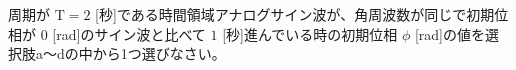 周期が $\textrm{T}=2$ [秒]である時間領域アナログサイン波が、角周波数が同じで初期位相が $0$ [rad]のサイン波と比べて $1$ [秒]進んでいる時の初期位相 $\phi$ [rad]の値を選択肢a〜dの中から1つ選びなさい。
